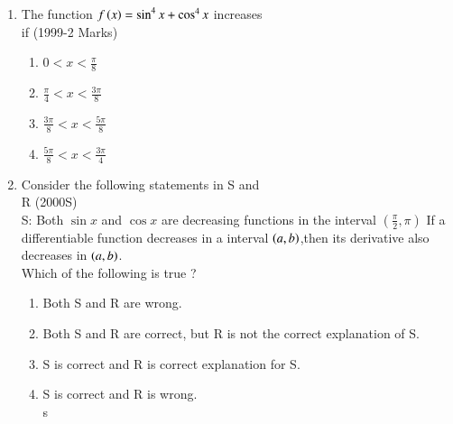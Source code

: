 \documentclass[journal,12pt,twocolumn]{IEEEtran}
\theoremstyle{remark}
\begin{document}
\begin{enumerate}[start=9]
\item The function $f\left(x\right)= \sin^4{x}+\cos^4{x}$ increases \\
	if \hfill (1999-2 Marks)
\begin{enumerate}
    \item $0<x<\frac{\pi}{8}$\\
    \item $\frac{\pi}{4}<x<\frac{3\pi}{8}$\\
    \item $\frac{3\pi}{8} <x<\frac{5\pi}{8}$\\
    \item $\frac{5\pi}{8}<x<\frac{3\pi}{4}$\\
\end{enumerate}
\item Consider the following statements in S and \\
R \hfill (2000S)\\
S: Both $\sin{x}$ and $\cos{x}$ are decreasing functions in the interval $\left(\frac{\pi}{2},\pi\right)$\: If a differentiable function decreases in a interval $\left(a,b\right)$,then its derivative also decreases in $\left(a,b\right)$.\\
Which of the following is true ?
\begin{enumerate}
    \item Both S and R are wrong.
    \item Both S and R are correct, but R is not the correct explanation of S.
    \item S is correct and R is correct explanation for S.
    \item S is correct and R is wrong.\\
s\end{enumerate}


\end{enumerate}
\end{document}
